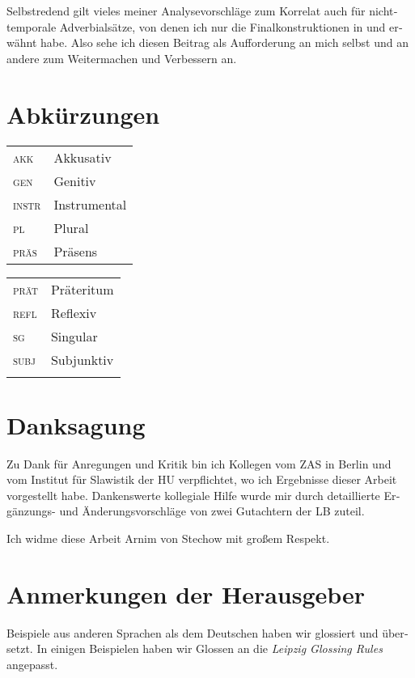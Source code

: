 \documentclass[output=paper, colorlinks, citecolor=brown, booklanguage=german]{langscibook}
\begin{document}
\begin{otherlanguage}{german}
Selbstredend gilt vieles meiner Analysevorschläge zum Korrelat auch für nichttemporale Adverbialsätze, von denen ich nur die Finalkonstruktionen in  und  erwähnt habe. Also sehe ich diesen Beitrag als Aufforderung an mich selbst und an andere zum Weitermachen und Verbessern an.


%

\section*{Abkürzungen}

\begin{tabularx}{.5\textwidth}{@{}lX@{}}
\textsc{akk}&Akkusativ\\
\textsc{gen}&Genitiv\\
\textsc{instr}&Instrumental\\
\textsc{pl}&Plural\\
\textsc{präs}&{Präsens}\\
\end{tabularx}%
\begin{tabularx}{.5\textwidth}{@{}lX@{}}
\textsc{prät}&{Präteritum}\\
\textsc{refl}&Reflexiv\\
\textsc{sg}&Singular\\
\textsc{subj}&Subjunktiv\\
&\\
\end{tabularx}

\section*{Danksagung}
Zu Dank für Anregungen und Kritik bin ich Kollegen vom ZAS in Berlin und vom Institut für Slawistik der HU verpflichtet, wo ich Ergebnisse dieser Arbeit vorgestellt habe. Dankenswerte kollegiale Hilfe wurde mir durch detaillierte Er\-gän\-zungs- und Änderungsvorschläge von zwei Gutachtern der LB zuteil.

\vspace{5mm} %

\noindent Ich widme diese Arbeit Arnim von Stechow mit großem Respekt.

\section*{Anmerkungen der Herausgeber}
Beispiele aus anderen Sprachen als dem Deutschen haben wir glossiert und übersetzt. In einigen Beispielen haben wir Glossen an die \textit{Leipzig Glossing Rules} an\-ge\-passt. 

\sloppy
\printbibliography[heading=subbibliography,notkeyword=this]

\end{otherlanguage}
\end{document}
